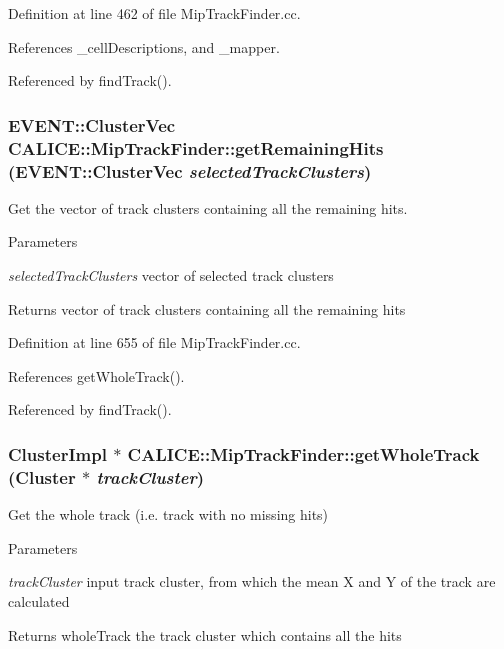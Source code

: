 Definition at line 462 of file MipTrackFinder.cc.

References \_\-cellDescriptions, and \_\-mapper.

Referenced by findTrack().
\subsubsection[{getRemainingHits}]{\setlength{\rightskip}{0pt plus 5cm}EVENT::ClusterVec CALICE::MipTrackFinder::getRemainingHits (EVENT::ClusterVec {\em selectedTrackClusters})\hspace{0.3cm}{\ttfamily  [private]}}\label{classCALICE_1_1MipTrackFinder_a7ef668cb721bb6efe876222827fb7052}


Get the vector of track clusters containing all the remaining hits. 
\begin{DoxyParams}{Parameters}
\item[{\em selectedTrackClusters}]vector of selected track clusters \end{DoxyParams}
\begin{DoxyReturn}{Returns}
vector of track clusters containing all the remaining hits 
\end{DoxyReturn}


Definition at line 655 of file MipTrackFinder.cc.

References getWholeTrack().

Referenced by findTrack().
\subsubsection[{getWholeTrack}]{\setlength{\rightskip}{0pt plus 5cm}ClusterImpl $\ast$ CALICE::MipTrackFinder::getWholeTrack (Cluster $\ast$ {\em trackCluster})\hspace{0.3cm}{\ttfamily  [private]}}\label{classCALICE_1_1MipTrackFinder_a47c6706fc34d1948fac2f2db0999aa28}


Get the whole track (i.e. track with no missing hits) 
\begin{DoxyParams}{Parameters}
\item[{\em trackCluster}]input track cluster, from which the mean X and Y of the track are calculated \end{DoxyParams}
\begin{DoxyReturn}{Returns}
wholeTrack the track cluster which contains all the hits 
\end{DoxyReturn}


